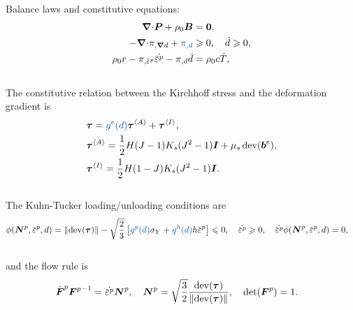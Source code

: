 \begin{frame}{}
\vspace{-1em}
Balance laws and constitutive equations:
\begin{align}
    \divergence \bs{P} + \rho_0 \bs{B} &= \bs{0}, \\
    - \divergence \pi_{, \grad d} + \textcolor{dukeroyal}{\pi_{, d}} &\geqslant 0, \quad \dot{d} \geqslant 0, \\
    \rho_0 r - \pi_{, \plasticstrain} \dot{\plasticstrain} - \pi_{, d} \dot{d} &= \rho_0 c \dot{T},
\end{align} \\
The constitutive relation between the Kirchhoff stress and the deformation gradient is
\begin{subequations}
\begin{align}
    & \bs{\tau} = \textcolor{dukeroyal}{g^e(d)}\bs{\tau}^\activeenergy + \bs{\tau}^\inactiveenergy, \\
    & \bs{\tau}^\activeenergy = \dfrac{1}{2} H(J-1) K_s (J^2-1) \bs{I} + \mu_s \dev(\bs{b}^e), \\
    & \bs{\tau}^\inactiveenergy = \dfrac{1}{2} H(1-J) K_s (J^2-1) \bs{I}.
\end{align}
\end{subequations} \\
The Kuhn-Tucker loading/unloading conditions are
\begin{align}
    & \phi(\bs{N}^p, \plasticstrain, d) = \norm{\dev(\bs{\tau})} - \sqrt{\dfrac{2}{3}} \left[ \textcolor{dukeroyal}{g^p(d)} \sigma_Y + \textcolor{dukeroyal}{g^h(d)} h \plasticstrain \right] \leqslant 0, \quad \dot{\plasticstrain} \geqslant 0, \quad \dot{\plasticstrain}\phi(\bs{N}^p, \plasticstrain, d) = 0,
\end{align} \\
and the flow rule is \\
\begin{align}
    & \dot{\defgrad}^p {\defgrad^p}^{-1} = \dot{\plasticstrain} \bs{N}^p, \quad \bs{N}^p = \sqrt{\dfrac{3}{2}} \dfrac{\dev(\bs{\tau})}{\norm{\dev(\bs{\tau})}}, \quad \det(\defgrad^p) = 1.
\end{align}
\end{frame}

\begin{frame}{}
 \\

\end{frame}

\begin{frame}{}
 \\

\end{frame}

